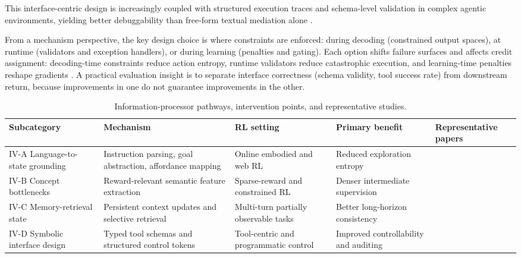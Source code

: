 ﻿\documentclass[conference]{IEEEtran}
\begin{document}
This interface-centric design is increasingly coupled with structured execution traces and schema-level validation in complex agentic environments, yielding better debuggability than free-form textual mediation alone \cite{arxiv_p_2509_12867,arxiv_p_2509_14480,arxiv_p_2510_18383,arxiv_p_2602_00528}.

From a mechanism perspective, the key design choice is where constraints are enforced: during decoding (constrained output spaces), at runtime (validators and exception handlers), or during learning (penalties and gating). Each option shifts failure surfaces and affects credit assignment: decoding-time constraints reduce action entropy, runtime validators reduce catastrophic execution, and learning-time penalties reshape gradients \cite{arxiv_p_2602_03022,doi_p_10_1609_icaps_v34i1_31503,doi_p_10_3390_make8010022,doi_p_10_32388_8vog0o}. A practical evaluation insight is to separate interface correctness (schema validity, tool success rate) from downstream return, because improvements in one do not guarantee improvements in the other.

\begin{table}[t]
\centering
\footnotesize
\setlength{\tabcolsep}{4pt}
\begin{tabularx}{\textwidth}{P{2.2cm}P{3.2cm}P{2.0cm}P{2.0cm}Y}
\toprule
\textbf{Subcategory} & \textbf{Mechanism} & \textbf{RL setting} & \textbf{Primary benefit} & \textbf{Representative papers}\\
\midrule
IV-A Language-to-state grounding & Instruction parsing, goal abstraction, affordance mapping & Online embodied and web RL & Reduced exploration entropy & \cite{arxiv_p_2204_01691,doi_p_10_1109_icra48891_2023_10160591,arxiv_p_2310_17722}\\
IV-B Concept bottlenecks & Reward-relevant semantic feature extraction & Sparse-reward and constrained RL & Denser intermediate supervision & \cite{arxiv_p_2303_00001,arxiv_p_2309_06687,arxiv_p_2510_10197}\\
IV-C Memory-retrieval state & Persistent context updates and selective retrieval & Multi-turn partially observable tasks & Better long-horizon consistency & \cite{arxiv_p_2404_03648,arxiv_p_2511_14460,arxiv_p_2602_00994}\\
IV-D Symbolic interface design & Typed tool schemas and structured control tokens & Tool-centric and programmatic control & Improved controllability and auditing & \cite{doi_p_10_3390_make8010022,arxiv_p_2512_20275,arxiv_p_2602_03022}\\
\bottomrule
\end{tabularx}
\caption{Information-processor pathways, intervention points, and representative studies.}
\label{tab:t1_info}
\end{table}
\end{document}
